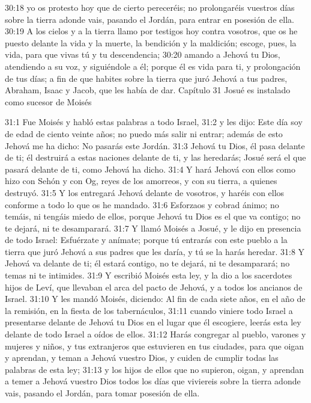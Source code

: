 30:18 yo os protesto hoy que de cierto pereceréis; no prolongaréis vuestros días sobre la tierra adonde vais, pasando el Jordán, para entrar en posesión de ella.  
30:19 A los cielos y a la tierra llamo por testigos hoy contra vosotros, que os he puesto delante la vida y la muerte, la bendición y la maldición; escoge, pues, la vida, para que vivas tú y tu descendencia;  
30:20 amando a Jehová tu Dios, atendiendo a su voz, y siguiéndole a él; porque él es vida para ti, y prolongación de tus días; a fin de que habites sobre la tierra que juró Jehová a tus padres, Abraham, Isaac y Jacob, que les había de dar.  
Capítulo 31
Josué es instalado como sucesor de Moisés  

31:1 Fue Moisés y habló estas palabras a todo Israel,  
31:2 y les dijo: Este día soy de edad de ciento veinte años; no puedo más salir ni entrar; además de esto Jehová me ha dicho: No pasarás este Jordán.  
31:3 Jehová tu Dios, él pasa delante de ti; él destruirá a estas naciones delante de ti, y las heredarás; Josué será el que pasará delante de ti, como Jehová ha dicho.  
31:4 Y hará Jehová con ellos como hizo con Sehón y con Og, reyes de los amorreos, y con su tierra, a quienes destruyó. 
31:5 Y los entregará Jehová delante de vosotros, y haréis con ellos conforme a todo lo que os he mandado.  
31:6 Esforzaos y cobrad ánimo; no temáis, ni tengáis miedo de ellos, porque Jehová tu Dios es el que va contigo; no te dejará, ni te desamparará.  
31:7 Y llamó Moisés a Josué, y le dijo en presencia de todo Israel: Esfuérzate y anímate; porque tú entrarás con este pueblo a la tierra que juró Jehová a sus padres que les daría, y tú se la harás heredar.  
31:8 Y Jehová va delante de ti; él estará contigo, no te dejará, ni te desamparará; no temas ni te intimides.  
31:9 Y escribió Moisés esta ley, y la dio a los sacerdotes hijos de Leví, que llevaban el arca del pacto de Jehová, y a todos los ancianos de Israel. 
31:10 Y les mandó Moisés, diciendo: Al fin de cada siete años, en el año de la remisión, en la fiesta de los tabernáculos, 
31:11 cuando viniere todo Israel a presentarse delante de Jehová tu Dios en el lugar que él escogiere, leerás esta ley delante de todo Israel a oídos de ellos.  
31:12 Harás congregar al pueblo, varones y mujeres y niños, y tus extranjeros que estuvieren en tus ciudades, para que oigan y aprendan, y teman a Jehová vuestro Dios, y cuiden de cumplir todas las palabras de esta ley;  
31:13 y los hijos de ellos que no supieron, oigan, y aprendan a temer a Jehová vuestro Dios todos los días que viviereis sobre la tierra adonde vais, pasando el Jordán, para tomar posesión de ella.  
